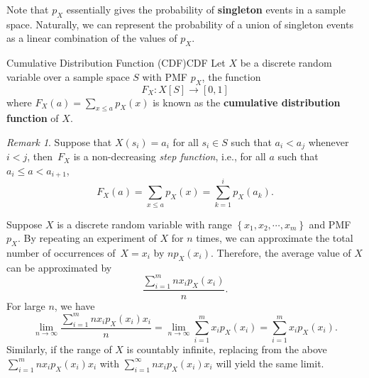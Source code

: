 \documentclass[math]{amznotes}
\theoremstyle{remark}
\newtheorem*{remark}{Remark}
\newcommand{\0}{\mathbf{0}}
\newcommand{\1}{\mathbf{1}}
\begin{document}
Note that $p_X$ essentially gives the probability of \textbf{singleton} events in a sample space. Naturally, we can represent the probability of a union of singleton events as a linear combination of the values of $p_X$.
\begin{dfnbox}{Cumulative Distribution Function (CDF)}{CDF}
    Let $X$ be a discrete random variable over a sample space $S$ with PMF $p_X$, the function
    \begin{displaymath}
        F_X \colon X[S] \to [0, 1]
    \end{displaymath}
    where $F_X(a) = \sum_{x \leq a}p_X(x)$ is known as the {\color{red} \textbf{cumulative distribution function}} of $X$.
\end{dfnbox}
\begin{notebox}
    \begin{remark}
        Suppose that $X(s_i) = a_i$ for all $s_i \in S$ such that $a_i < a_j$ whenever $i < j$, then~$F_X$ is a non-decreasing \textit{step function}, i.e., for all $a$ such that $a_i \leq a < a_{i + 1}$,
        \begin{equation*}
            F_X(a) = \sum_{x \leq a}p_X(x) = \sum_{k = 1}^{i}p_X(a_k).
        \end{equation*}
    \end{remark}
\end{notebox}
Suppose $X$ is a discrete random variable with range $\left\{x_1, x_2, \cdots, x_m\right\}$ and PMF $p_X$. By repeating an experiment of $X$ for $n$ times, we can approximate the total number of occurrences of~$X = x_i$ by $np_X(x_i)$. Therefore, the average value of $X$ can be approximated by
\begin{equation*}
    \frac{\sum_{i = 1}^{m}nx_ip_X(x_i)}{n}.
\end{equation*}
For large $n$, we have
\begin{equation*}
    \lim_{n \to \infty}\frac{\sum_{i = 1}^{m}nx_ip_X(x_i)x_i}{n} = \lim_{n \to \infty}\sum_{i = 1}^{m}x_ip_X(x_i) = \sum_{i = 1}^{m}x_ip_X(x_i).
\end{equation*}
Similarly, if the range of $X$ is countably infinite, replacing from the above $\sum_{i = 1}^{m}nx_ip_X(x_i)x_i$ with $\sum_{i = 1}^{\infty}nx_ip_X(x_i)x_i$ will yield the same limit.
\end{document}
